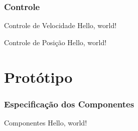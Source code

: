 \documentclass{beamer}
\begin{document}
\subsubsection{Controle}
\begin{frame}{Controle de Velocidade}
  Hello, world!
\end{frame}
\begin{frame}{Controle de Posição}
  Hello, world!
\end{frame}

\section{Protótipo}
\subsubsection{Especificação dos Componentes}
\begin{frame}{Componentes}
  Hello, world!
\end{frame}

\end{document}
